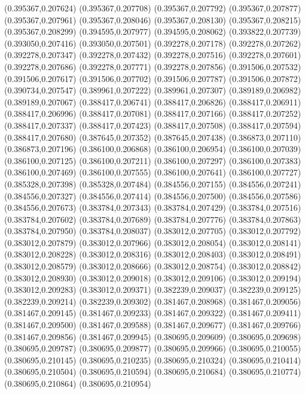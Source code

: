 (0.395367,0.207624)
(0.395367,0.207708)
(0.395367,0.207792)
(0.395367,0.207877)
(0.395367,0.207961)
(0.395367,0.208046)
(0.395367,0.208130)
(0.395367,0.208215)
(0.395367,0.208299)
(0.394595,0.207977)
(0.394595,0.208062)
(0.393822,0.207739)
(0.393050,0.207416)
(0.393050,0.207501)
(0.392278,0.207178)
(0.392278,0.207262)
(0.392278,0.207347)
(0.392278,0.207432)
(0.392278,0.207516)
(0.392278,0.207601)
(0.392278,0.207686)
(0.392278,0.207771)
(0.392278,0.207856)
(0.391506,0.207532)
(0.391506,0.207617)
(0.391506,0.207702)
(0.391506,0.207787)
(0.391506,0.207872)
(0.390734,0.207547)
(0.389961,0.207222)
(0.389961,0.207307)
(0.389189,0.206982)
(0.389189,0.207067)
(0.388417,0.206741)
(0.388417,0.206826)
(0.388417,0.206911)
(0.388417,0.206996)
(0.388417,0.207081)
(0.388417,0.207166)
(0.388417,0.207252)
(0.388417,0.207337)
(0.388417,0.207423)
(0.388417,0.207508)
(0.388417,0.207594)
(0.388417,0.207680)
(0.387645,0.207352)
(0.387645,0.207438)
(0.386873,0.207110)
(0.386873,0.207196)
(0.386100,0.206868)
(0.386100,0.206954)
(0.386100,0.207039)
(0.386100,0.207125)
(0.386100,0.207211)
(0.386100,0.207297)
(0.386100,0.207383)
(0.386100,0.207469)
(0.386100,0.207555)
(0.386100,0.207641)
(0.386100,0.207727)
(0.385328,0.207398)
(0.385328,0.207484)
(0.384556,0.207155)
(0.384556,0.207241)
(0.384556,0.207327)
(0.384556,0.207414)
(0.384556,0.207500)
(0.384556,0.207586)
(0.384556,0.207673)
(0.383784,0.207343)
(0.383784,0.207429)
(0.383784,0.207516)
(0.383784,0.207602)
(0.383784,0.207689)
(0.383784,0.207776)
(0.383784,0.207863)
(0.383784,0.207950)
(0.383784,0.208037)
(0.383012,0.207705)
(0.383012,0.207792)
(0.383012,0.207879)
(0.383012,0.207966)
(0.383012,0.208054)
(0.383012,0.208141)
(0.383012,0.208228)
(0.383012,0.208316)
(0.383012,0.208403)
(0.383012,0.208491)
(0.383012,0.208579)
(0.383012,0.208666)
(0.383012,0.208754)
(0.383012,0.208842)
(0.383012,0.208930)
(0.383012,0.209018)
(0.383012,0.209106)
(0.383012,0.209194)
(0.383012,0.209283)
(0.383012,0.209371)
(0.382239,0.209037)
(0.382239,0.209125)
(0.382239,0.209214)
(0.382239,0.209302)
(0.381467,0.208968)
(0.381467,0.209056)
(0.381467,0.209145)
(0.381467,0.209233)
(0.381467,0.209322)
(0.381467,0.209411)
(0.381467,0.209500)
(0.381467,0.209588)
(0.381467,0.209677)
(0.381467,0.209766)
(0.381467,0.209856)
(0.381467,0.209945)
(0.380695,0.209609)
(0.380695,0.209698)
(0.380695,0.209787)
(0.380695,0.209877)
(0.380695,0.209966)
(0.380695,0.210055)
(0.380695,0.210145)
(0.380695,0.210235)
(0.380695,0.210324)
(0.380695,0.210414)
(0.380695,0.210504)
(0.380695,0.210594)
(0.380695,0.210684)
(0.380695,0.210774)
(0.380695,0.210864)
(0.380695,0.210954)
